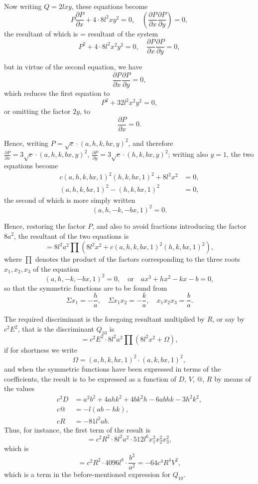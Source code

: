 \documentclass[11pt,a4paper]{article}
\theoremstyle{definition}
\begin{document}
Now writing $Q = 2lxy$, these equations become
\[
P\frac{\partial P}{\partial x} + 4\cdot 8l^2xy^2 = 0,\quad \left(\frac{\partial P}{\partial x}\frac{\partial P}{\partial y}\right) = 0,
\]
the resultant of which is = resultant of the system
\[
P^2 + 4\cdot 8l^2x^2y^2 = 0,\quad \frac{\partial P}{\partial x}\frac{\partial P}{\partial y} = 0,
\]

\newpage

but in virtue of the second equation, we have
\[
\frac{\partial P}{\partial x}\frac{\partial P}{\partial y} = 0,
\]
which reduces the first equation to
\[
P^2 + 32l^2x^2y^2 = 0,
\]
or omitting the factor $2y$, to
\[
\frac{\partial P}{\partial x} = 0.
\]

Hence, writing $P = \sqrt{c} \cdot (a,h,k,b x,y)^2$, and therefore $\frac{\partial P}{\partial x} = 3\sqrt{c} \cdot (a,h,k,b x,y)^2$, $\frac{\partial P}{\partial y} = 3\sqrt{c} \cdot (h,k,b x,y)^2$; writing also $y = 1$, the two equations become
\begin{align*}
c(a,h,k,b x,1)^2(h,k,b x,1)^2 + 8l^2x^2 &= 0,\\
(a,h,k,b x,1)^2 - (h,k,b x,1)^2 &= 0,
\end{align*}
the second of which is more simply written
\[
(a,h,-k,-b x,1)^2 = 0.
\]

Hence, restoring the factor $P$, and also to avoid fractions introducing the factor $8a^2$, the resultant of the two equations is
\[
= 8l^2a^2 \prod (8l^2x^2 + c(a,h,k,b x,1)^2(h,k,b x,1)^2),
\]
where $\prod$ denotes the product of the factors corresponding to the three roots $x_1, x_2, x_3$ of the equation
\[
(a,h,-k,-b x,1)^2 = 0,\quad \text{or}\quad ax^3 + hx^2 - kx - b = 0,
\]
so that the symmetric functions are to be found from
\[
\Sigma x_1 = -\frac{h}{a},\quad \Sigma x_1x_2 = -\frac{k}{a},\quad x_1x_2x_3 = \frac{b}{a}.
\]

\newpage

The required discriminant is the foregoing resultant multiplied by $R$, or say by $c^2E^2$, that is the discriminant $Q_{10}$ is
\[
= c^2E^2 \cdot 8l^2a^2 \prod (8l^2x^2 + \Omega),
\]
if for shortness we write
\[
\Omega = (a,h,k,b x,1)^2 \cdot (a,k,b x,1)^2,
\]
and when the symmetric functions have been expressed in terms of the coefficients, the result is to be expressed as a function of $D$, $V$, $\text{@}$, $R$ by means of the values
\begin{align*}
c^2D &= a^2b^2 + 4ahk^2 + 4bk^2h - 6abhk - 3h^2k^2,\\
c\text{@} &= -l(ab - hk),\\
cR &= -81l^2ab.
\end{align*}
Thus, for instance, the first term of the result is
\[
= c^2R^2 \cdot 8l^2a^2 \cdot 512l^6x_1^2x_2^2x_3^2,
\]
which is
\[
= c^2R^2 \cdot 4096l^8 \cdot \frac{b^2}{a^2} = -64c^4R^4V^2,
\]
which is a term in the before-mentioned expression for $Q_{10}$.
\end{document}
